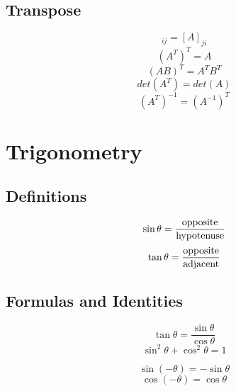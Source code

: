 \documentclass{article}
\begin{document}
		\subsection{Transpose}
			\begin{equation}
				[A^\mathrm{T}]_{ij} = [A]_{ji}
			\end{equation}
			\begin{equation}
				(A^T)^T = A
			\end{equation}
			\begin{equation}
				(AB)^T = A^TB^T
			\end{equation}
			\begin{equation}
				det(A^T) = det(A)
			\end{equation}
			\begin{equation}
				(A^T)^{-1} = (A^{-1})^T
			\end{equation}
\section{Trigonometry}
	\subsection{Definitions}
		\begin{equation}
			\sin \theta = \frac{{{\rm{opposite}}}}{{{\rm{hypotenuse}}}}
		\end{equation}
		\begin{equation}
			\tan \theta = \frac{{{\rm{opposite}}}}{{{\rm{adjacent}}}}
		\end{equation}
	\subsection{Formulas and Identities}
		\begin{equation}
			\tan \theta = \frac{\sin \theta}{\cos \theta}
		\end{equation}
		\begin{equation}
			\sin^2 \theta + \cos^2 \theta = 1
		\end{equation}
		
		\begin{equation}
			\sin(-\theta) = - \sin \theta 
		\end{equation}
		\begin{equation}
			\cos(-\theta) = \cos \theta 
		\end{equation}
		
\end{document}
